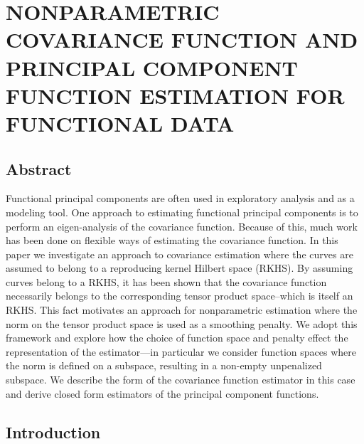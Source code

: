 

\chapter{NONPARAMETRIC COVARIANCE FUNCTION AND PRINCIPAL COMPONENT FUNCTION ESTIMATION FOR FUNCTIONAL DATA} \label{ch:covariance estimation}

\section{Abstract} 

\label{sec:abstract}

Functional principal components are often used in exploratory analysis and as a modeling tool. One approach to estimating functional principal components is to perform an eigen-analysis of the covariance function. Because of this, much work has been done on flexible ways of estimating the covariance function. In this paper we investigate an approach to covariance estimation where the curves are assumed to belong to a reproducing kernel Hilbert space (RKHS). By assuming curves belong to a RKHS, it has been shown that the covariance function necessarily belongs to the corresponding tensor product space--which is itself an RKHS. This fact motivates an approach for nonparametric estimation where the norm on the tensor product space is used as a smoothing penalty. We adopt this framework and explore how the choice of function space and penalty effect the representation of the estimator---in particular we consider function spaces where the norm is defined on a subspace, resulting in a non-empty unpenalized subspace. We describe the form of the covariance function estimator in this case and derive closed form estimators of the principal component functions. 

\section{Introduction} 

\label{sec:introduction}


